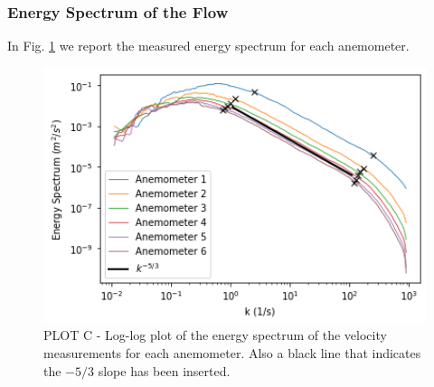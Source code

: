 \documentclass[11pt,titlepage]{article}
\begin{document}
\subsubsection{Energy Spectrum of the Flow} \label{energy_spectrum}
In Fig. \ref{fig3} we report the measured energy spectrum for each anemometer.
	\begin{center} 
	\begin{figure} [h]
		\centering
		\includegraphics[width = 5in]{./figures/ex1_3.png}
		\caption{PLOT C - Log-log plot of the energy spectrum of the velocity measurements for each anemometer.  Also a black line that indicates the $-5/3$ slope has been inserted.}
		\label{fig3}
	\end{figure}
\end{center}
\end{document}
